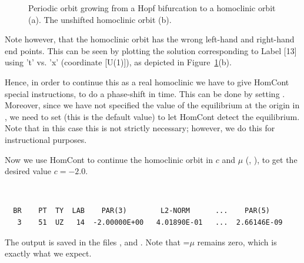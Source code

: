\documentclass[12pt]{report}
\begin{document}
\begin{figure}[htb]
\begin{center}
\begin{picture}
\end{picture}
\caption{Periodic orbit growing from a Hopf bifurcation to a
  homoclinic orbit (a). The unshifted homoclinic orbit (b).}
\label{hopfbif}
\end{center}
\end{figure}

Note however, that the homoclinic orbit has the wrong left-hand and
right-hand end points. This can be seen by plotting the solution
corresponding to Label [13] using 't' vs. 'x' (coordinate [U(1)]), 
as depicted in Figure~\ref{hopfbif}(b).

Hence, in order to continue this as a real homoclinic 
we have to give {\cal HomCont} special instructions, to do a phase-shift in
time. This can be done by setting . Moreover, 
since we have not specified the value of
the equilibrium at the origin in , 
we need to set  (this is the default value) to let
{\cal HomCont} detect the equilibrium. Note that in this case this is not
strictly necessary; however, we do this for instructional purposes.

Now we use {\cal HomCont} to continue the homoclinic orbit in $c$ and $\mu$ 
(, ), to get the desired value $c=-2.0$.
\begin{center}
 \\
\end{center}
\begin{verbatim}
  BR    PT  TY  LAB    PAR(3)        L2-NORM      ...    PAR(5)     
   3    51  UZ   14  -2.00000E+00   4.01890E-01   ...  2.66146E-09
\end{verbatim}
The output is saved in the files ,  and
. Note that =$\mu$ remains zero, which is exactly
what we expect.
\end{document}

